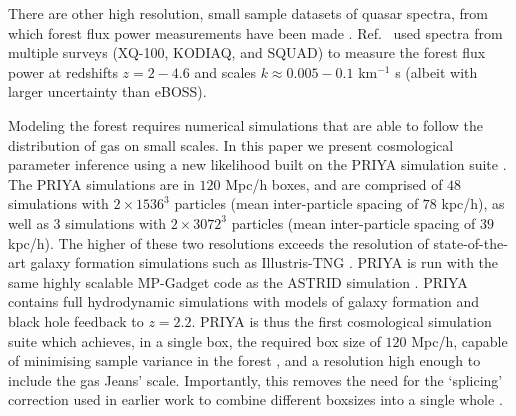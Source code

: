 There are other high resolution, small sample datasets of quasar spectra, from which \lya forest flux power measurements have been made \cite{2017MNRAS.466.4332I, 2022MNRAS.509.2842K, 2019MNRAS.489.2536D}. Ref.~\cite{2022MNRAS.509.2842K} used spectra from multiple surveys (XQ-100, KODIAQ, and SQUAD) to measure the \lya forest flux power at redshifts $z=2-4.6$ and scales $k\approx0.005-0.1$ km$^{-1}$ s (albeit with larger uncertainty than eBOSS).

Modeling the \lya forest requires numerical simulations that are able to follow the distribution of gas on small scales.
In this paper we present cosmological parameter inference using a new likelihood built on the PRIYA simulation suite \cite{2023simsuite}.
The PRIYA simulations are in $120$ Mpc/h boxes, and are comprised of $48$ simulations with $2\times 1536^3$ particles (mean inter-particle spacing of $78$ kpc/h), as well as $3$ simulations with $2\times 3072^3$ particles (mean inter-particle spacing of $39$ kpc/h).
The higher of these two resolutions exceeds the resolution of state-of-the-art galaxy formation simulations such as Illustris-TNG \cite{2018MNRAS.475..676S}.
PRIYA is run with the same highly scalable MP-Gadget code as the ASTRID simulation \cite{2022MNRAS.512.3703B,2022MNRAS.513..670N}.
PRIYA contains full hydrodynamic simulations with models of galaxy formation and black hole feedback to $z=2.2$.
PRIYA is thus the first cosmological simulation suite which achieves, in a single box, the required box size of $120$ Mpc/h, capable of minimising sample variance in the \lya forest \cite{2014JCAP...07..005B}, and a resolution high enough to include the gas Jeans' scale.
Importantly, this removes the need for the `splicing' correction used in earlier work to combine different boxsizes into a single whole \cite{2014JCAP...07..005B,2020JCAP...04..038P}.

